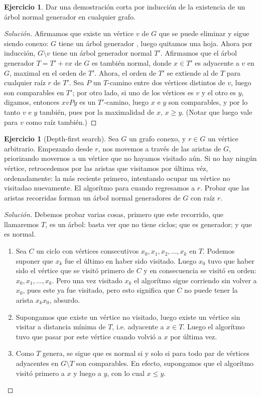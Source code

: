 \documentclass[12pt]{report}
\theoremstyle{plain}
\theoremstyle{definition}
\newtheorem{exercise}[theorem]{Ejercicio}
\newenvironment{solution}{\begin{proof}[Solución]}{\end{proof}}
\begin{document}
\begin{exercise}
Dar una demostración corta por inducción de la existencia de un árbol normal generador en cualquier grafo.
\end{exercise}
\begin{solution}
Afirmamos que existe un vértice $v$ de $G$ que se puede eliminar y sigue siendo conexo: $G$ tiene un árbol generador
, luego quitamos una hoja. Ahora por inducción, $G \setminus v$ tiene un árbol generador normal $T'$. Afirmamos
que el árbol generador $T = T'+ vx$ de $G$ es también normal, donde $x \in T'$ es adyacente a $v$ en $G$, maximal
en el orden de $T'$.
Ahora, el orden de $T'$ se extiende al de $T$ para cualquier raíz $r$ de $T'$. Sea $P$ un $T$-camino entre dos vértices distintos de $v$, luego son comparables en $T'$; por otro lado, si uno de los vértices es $v$ y el otro es $y$, digamos, entonces $x v P y$ es un $T'$-camino, luego $x$ e $y$ son comparables, y por lo tanto $v$ e $y$ también, pues por la maximalidad de $x$, $x \geq y$. (Notar que luego vale para $v$ como raíz también.)
\end{solution}


\begin{exercise}[Depth-first search]
Sea $G$ un grafo conexo, y $r \in G$ un vértice arbitrario. Empezando desde $r$, nos movemos a través de las aristas
de $G$, priorizando movernos a un vértice que no hayamos visitado aún. Si no hay ningún vértice, retrocedemos por las
aristas que visitamos por última véz, ordenadamente: la más reciente primero, intentando ocupar un vértice no
visitadao nuevamente. El algorítmo para cuando regresamos a $r$. Probar que las aristas recorridas forman un árbol
normal generadores de $G$ con raíz $r$.
\end{exercise}
\begin{solution}
Debemos probar varias cosas, primero que este recorrido, que llamaremos $T$, es un árbol: basta ver que no tiene
ciclos;
que
es generador; y que es
normal.
\begin{enumerate}[1.]
\item Sea $C$ un ciclo con vértices consecutivos $x_0, x_1, x_2 , \ldots, x_k$ en $T$. Podemos suponer que $x_k$ fue
el último en haber sido visitado. Luego $x_0$ tuvo que haber sido el vértice que se visitó primero de $C$ y en
consecuencia se visitó en orden: $x_0, x_1, \ldots, x_k$. Pero una vez visitado $x_k$ el algorítmo sigue corriendo
sin volver a $x_0$, pues este ya fue visitado, pero esto significa que $C$ no puede tener la arista $x_k x_0$,
absurdo.
\item Supongamos que existe un vértice no visitado, luego existe un vértice sin visitar a distancia mínima de $T$,
i.e. adyacente a $x \in T$. Luego el algorítmo tuvo que pasar por este vértice cuando volvió a $x$ por última vez.
\item Como $T$ genera, se sigue que es normal si y solo si para todo par de vértices adyacentes en $G \setminus T$ son comparables. En efecto, supongamos que el algorítmo visitó primero a $x$ y luego a $y$, con lo cual $x \leq y$.
\end{enumerate}
\end{solution}
\end{document}
